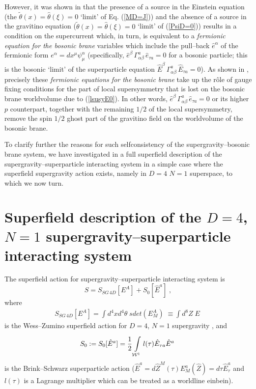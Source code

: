 \documentclass[a4paper,11pt]{article}
\begin{document}
However, it was shown in \cite{BdAI1} that the presence of a source 
in the Einstein equation (the $\tilde{\theta}(x)=\hat{\theta}(\xi)=0$ 
`limit' of 
Eq. (\ref{MD=J})) and the absence of a source in the 
gravitino equation ($\tilde{\theta}(x)=\hat{\theta}(\xi)=0$ `limit' of 
(\ref{PsiD=0})) results in a condition on the supercurrent which, in  turn, 
is equivalent to a {\sl fermionic equation for the bosonic brane} variables 
which include the pull--back $\hat{e}^{\alpha}$ of the fermionic form 
$e^\alpha=dx^\mu \psi_\mu^\alpha$  
(specifically, $\hat{e}^{\beta}\, 
\Gamma^a_{{\alpha}{\beta}}\, \hat{e}_{\tau a} =0$
for a bosonic particle; this 
is the bosonic `limit' of the superparticle equation 
$\hat{E}^{\beta}\, 
\Gamma^a_{{\alpha}{\beta}}\, \hat{E}_{\tau a} =0$). 
As shown in \cite{BdAI1}, precisely these {\sl fermionic equations 
for the bosonic brane} take up the r\^ole of gauge fixing conditions for 
the part of 
local supersymmetry that is lost on the bosonic brane worldvolume 
due to  (\ref{lsusyE0}). In other words, $\hat{e}^{\beta}\, 
\Gamma^a_{{\alpha}{\beta}}\, \hat{e}_{\tau a} =0$ or its higher $p$
counterpart, together with the remaining $1/2$ of the 
local supersymmetry, remove the spin $1/2$ ghost 
part of the gravitino field on the worldvolume of the bosonic brane. 


To clarify further the reasons  for such selfconsistency of the 
supergravity--bosonic brane system, we have investigated in \cite{BAIL4} 
a full superfield description of the supergravity--superparticle 
interacting system in a simple case where the superfield supergravity 
action exists, namely in $D=4$ $N=1$ superspace, to which we now turn.  


\section{Superfield description of the $D=4$, $N=1$ 
supergravity--superparticle interacting system}

The superfield action for supergravity--superparticle 
interacting system is  
\begin{equation}  \label{S=sf0} 
  S= S_{SG\, 4D}[E^A] + S_{0}[\hat{E}^a]  \; , 
\end{equation}
where 
\begin{eqnarray}\label{SGWZ}
S_{SG\, 4D}[E^A]= 
\int d^4 x {d}^4 \theta \; sdet(E_M^A) \; 
\equiv \int d^8 Z  \; E \; 
\end{eqnarray} 
is the Wess--Zumino superfield action for  $D=4$, $N=1$ supergravity 
\cite{WZ77}, and 
  \begin{eqnarray}
  \label{Sp0}
S_0:= S_{0}[\hat{E}^a]= {1\over 2}
\int\limits^{}_{{\cal W}^{1}} l(\tau) \hat{E}_{\tau a} \hat{E}^a  \;  
\end{eqnarray}
is the Brink--Schwarz superparticle action ($\hat{E}^a = 
d\hat{Z}^M(\tau) E^a_M(\hat{Z})= 
d\tau \hat{E}^a_{\tau}$ and $l(\tau)$ is a Lagrange multiplier 
which can be treated as a worldline einbein).  
\end{document}

